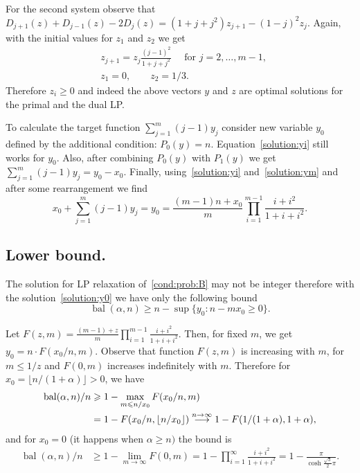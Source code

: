 \documentclass[12pt]{amsart}
\renewcommand{\leq}{\leqslant}
\renewcommand{\geq}{\geqslant}
\theoremstyle{definition}
\DeclareMathOperator{\bal}{bal}
\begin{document}
For the second system observe that $D_{j+1}(z)+D_{j-1}(z)-2D_j(z) = (1+j+j^2)z_{j+1}-(1-j)^2z_j$. Again, with the initial values for $z_1$ and $z_2$ we get
\begin{align*}
 & z_{j+1} = z_j \frac{(j-1)^2}{1+j+j^2}\quad\text{ for $j=2,\ldots,m-1$},\\
 & z_1 = 0, \quad\quad z_2 = 1/3.
\end{align*}
Therefore $z_i\geq0$ and indeed the above vectors $y$ and $z$ are optimal solutions for the primal and the dual LP.

To calculate the target function $\sum_{j=1}^m (j-1)y_j$ consider new variable $y_0$ defined by the additional condition: $P_0(y) = n$.
Equation~\eqref{solution:yi} still works for $y_0$. 
Also, after combining $P_0(y)$ with $P_1(y)$ we get $ \sum_{j=1}^m (j-1)y_j = y_0-x_0$.
Finally, using~\eqref{solution:yi} and~\eqref{solution:ym} and after some rearrangement we find 
\begin{equation}\label{solution:y0}
 x_0 + \sum_{j=1}^m (j-1)y_j = y_0 = \frac{(m-1) n+x_0}{ m} \prod_{i=1}^{m-1} \frac{i+i^2}{1+i+i^2}.
\end{equation}

 


\subsection{Lower bound.}
The solution for LP relaxation of~\eqref{cond:prob:B} may not be integer therefore with the solution~\eqref{solution:y0} we have only the following bound
\[
 \bal(\alpha,n) \geq n-\sup\{y_0 : n-mx_0\geq0\}.
\]


Let $F(z,m)=\frac{(m-1)+z}{m} \prod_{i=1}^{m-1} \frac{i+i^2}{1+i+i^2}$. 
Then, for fixed $m$, we get $y_0= n \cdot F(x_0/n,m)$. 
Observe that function $F(z,m)$ is increasing with $m$, for $m\leq 1/z$ and $F(0,m)$ increases indefinitely with $m$.
Therefore for $x_0 = \lfloor n / (1+\alpha)\rfloor > 0$, we have
\begin{align}\bal(\alpha,n)/n &\geq 1-\max_{m\leq n/x_0}F(x_0/n,m)\nonumber\\
		        &= 1-F(x_0/n,\lfloor n/x_0 \rfloor ) \buildrel n\to\infty\over\longrightarrow 1 - F(1/(1+\alpha),1+\alpha),\label{eq:balLB}
\end{align}
and for $x_0 = 0$ (it happens when $\alpha\geq n)$ the bound is
\begin{align}\label{eq:inftyLB}
  \bal(\alpha,n)/n &\geq 1-\lim_{m\to\infty}F(0,m) =1-\prod_{i=1}^{\infty}\frac{i+i^2}{1+i+i^2} =
  1-\frac{\pi}{\cosh\tfrac{\sqrt{3}}{2}\pi}.
\end{align}
\end{document}
